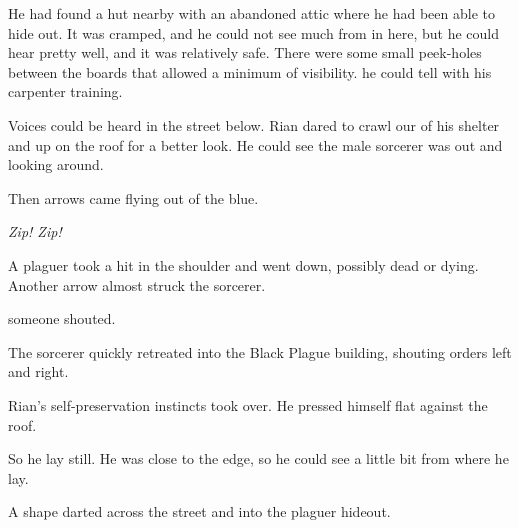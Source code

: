 He had found a hut nearby with an abandoned attic where he had been able to hide out. 
It was cramped, and he could not see much from in here, but he could hear pretty well, and it was relatively safe. 
There were some small peek-holes between the boards that allowed a minimum of visibility. 
 he could tell with his carpenter training. 

Voices could be heard in the street below. 
Rian dared to crawl our of his shelter and up on the roof for a better look. 
He could see the male sorcerer was out and looking around. 


Then arrows came flying out of the blue. 

\emph{Zip! Zip!}

A plaguer took a hit in the shoulder and went down, possibly dead or dying. 
Another arrow almost struck the sorcerer. 

 someone shouted. 

The sorcerer quickly retreated into the Black Plague building, shouting orders left and right. 

Rian's self-preservation instincts took over. 
He pressed himself flat against the roof. 

So he lay still. 
He was close to the edge, so he could see a little bit from where he lay. 

A shape darted across the street and into the plaguer hideout. 


